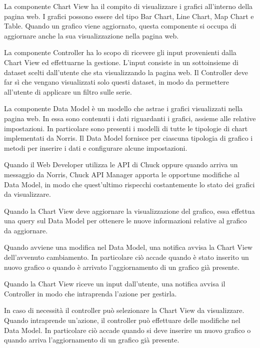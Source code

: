     	La componente Chart View ha il compito di visualizzare i grafici all'interno della pagina web. I grafici possono essere del tipo Bar Chart, Line Chart, Map Chart e Table. Quando un grafico viene aggiornato, questa componente si occupa di aggiornare anche la sua visualizzazione nella pagina web.

    	La componente Controller ha lo scopo di ricevere gli input provenienti dalla Chart View ed effettuarne la gestione. L'input consiste in un sottoinsieme di dataset scelti dall'utente che sta visualizzando la pagina web. Il Controller deve far sì che vengano visualizzati solo questi dataset, in modo da permettere all'utente di applicare un filtro sulle serie.

    	La componente Data Model è un modello che astrae i grafici visualizzati nella pagina web. In essa sono contenuti i dati riguardanti i grafici, assieme alle relative impostazioni. In particolare sono presenti i modelli di tutte le tipologie di chart implementati da Norris. Il Data Model fornisce per ciascuna tipologia di grafico i metodi per inserire i dati e configurare alcune impostazioni. 
    
	
		Quando il Web Developer utilizza le API di Chuck oppure quando arriva un messaggio da Norris, Chuck API Manager apporta le opportune modifiche al Data Model, in modo che quest'ultimo rispecchi costantemente lo stato dei grafici da visualizzare.

		Quando la Chart View deve aggiornare la visualizzazione del grafico, essa effettua una query sul Data Model per ottenere le nuove informazioni relative al grafico da aggiornare.

		Quando avviene una modifica nel Data Model, una notifica avvisa la Chart View dell'avvenuto cambiamento. In particolare ciò accade quando è stato inserito un nuovo grafico o quando è arrivato l'aggiornamento di un grafico già presente.

		Quando la Chart View riceve un input dall'utente, una notifica avvisa il Controller in modo che intraprenda l'azione per gestirla.

		In caso di necessità il controller può selezionare la Chart View da visualizzare.
		Quando intraprende un'azione, il controller può effettuare delle modifiche nel Data Model. In particolare ciò accade quando si deve inserire un nuovo grafico o quando arriva l'aggiornamento di un grafico già presente.
